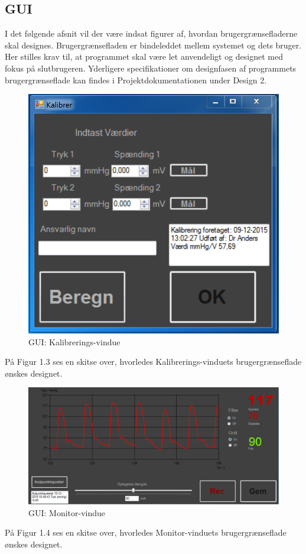 \subsection{GUI}
I det følgende afsnit vil der være indsat figurer af, hvordan brugergrænsefladerne skal designes. Brugergrænsefladen er bindeleddet mellem systemet og dets bruger. Her stilles krav til, at programmet skal være let anvendeligt og designet med fokus på slutbrugeren. Yderligere specifikationer om designfasen af programmets brugergrænseflade kan findes i Projektdokumentationen under Design 2.
\begin{figure}[H]
	\centering
	\includegraphics[width=1\textwidth]{Figurer/Kalibrer2}
	\caption{GUI:  Kalibrerings-vindue}
	\label{fig:GUI  Kalibrerings vindue}
\end{figure}
På Figur 1.3 ses en skitse over, hvorledes Kalibrerings-vinduets brugergrænseflade ønskes designet. 

\begin{figure}[H]
	\centering
	\includegraphics[width=1\textwidth]{Figurer/m}
	\caption{GUI:  Monitor-vindue}
	\label{fig:GUI  Monitor vindue}
\end{figure}
På Figur 1.4 ses en skitse over, hvorledes Monitor-vinduets brugergrænseflade ønskes designet.\\\\


